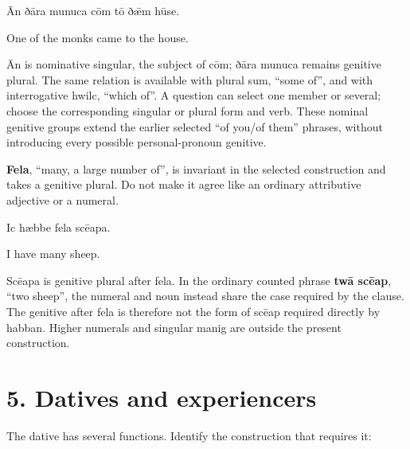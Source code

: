 Ān ðāra munuca cōm tō ðǣm hūse.

One of the monks came to the house.

Ān is nominative singular, the subject of cōm; ðāra munuca remains genitive plural. The same relation is available with plural sum, “some of”, and with interrogative hwilc, “which of”. A question can select one member or several; choose the corresponding singular or plural form and verb. These nominal genitive groups extend the earlier selected “of you/\allowbreak{}of them” phrases, without introducing every possible personal-pronoun genitive.

\textbf{Fela}, “many, a large number of”, is invariant in the selected construction and takes a genitive plural. Do not make it agree like an ordinary attributive adjective or a numeral.

Ic hæbbe fela scēapa.

I have many sheep.

Scēapa is genitive plural after fela. In the ordinary counted phrase \textbf{twā scēap}, “two sheep”, the numeral and noun instead share the case required by the clause. The genitive after fela is therefore not the form of scēap required directly by habban. Higher numerals and singular manig are outside the present construction.

\section*{5. Datives and experiencers}

The dative has several functions. Identify the construction that requires it:

